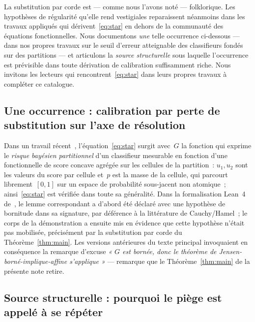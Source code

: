 \documentclass[11pt,a4paper]{amsart}
\begin{document}
La substitution par corde est --- comme nous l'avons noté --- folklorique.
Les hypothèses de régularité qu'elle rend vestigiales reparaissent
néanmoins dans les travaux appliqués qui dérivent~\eqref{eq:star} en
dehors de la communauté des équations fonctionnelles. Nous documentons
\emph{une} telle occurrence ci-dessous --- dans nos propres travaux sur le
seuil d'erreur atteignable des classifieurs fondés sur des partitions ---
et articulons la \emph{source structurelle} sous laquelle l'occurrence est
prévisible dans toute dérivation de calibration suffisamment riche. Nous
invitons les lecteurs qui rencontrent~\eqref{eq:star} dans leurs propres
travaux à compléter ce catalogue.

\subsection{Une occurrence : calibration par perte de substitution sur
l'axe de résolution}
\label{ssec:recurrence}

Dans un travail récent~\cite{El1,El2}, l'équation~\eqref{eq:star} surgit
avec~$G$ la fonction qui exprime le \emph{risque bayésien partitionnel}
d'un classifieur mesurable en fonction d'une fonctionnelle de score
concave agrégée sur les cellules de la partition~: $u_1, u_2$ sont les
valeurs du score par cellule et~$p$ est la masse de la cellule, qui
parcourt librement~$[0, 1]$ sur un espace de probabilité sous-jacent non
atomique~; ainsi~\eqref{eq:star} est vérifiée dans toute sa généralité.
Dans la formalisation Lean~4 de~\cite{El2}, le lemme correspondant a
d'abord été déclaré avec une hypothèse de bornitude dans sa signature, par
déférence à la littérature de Cauchy/Hamel~; le corps de la démonstration
a ensuite mis en évidence que cette hypothèse n'était pas mobilisée,
précisément par la substitution par corde du Théorème~\ref{thm:main}. Les
versions antérieures du texte principal invoquaient en conséquence la
remarque d'excuse \emph{« $G$ est bornée, donc le théorème de
Jensen-borné-implique-affine s'applique »} --- remarque que le
Théorème~\ref{thm:main} de la présente note retire.

\subsection{Source structurelle : pourquoi le piège est appelé à se
répéter}
\label{ssec:structural}
\end{document}
